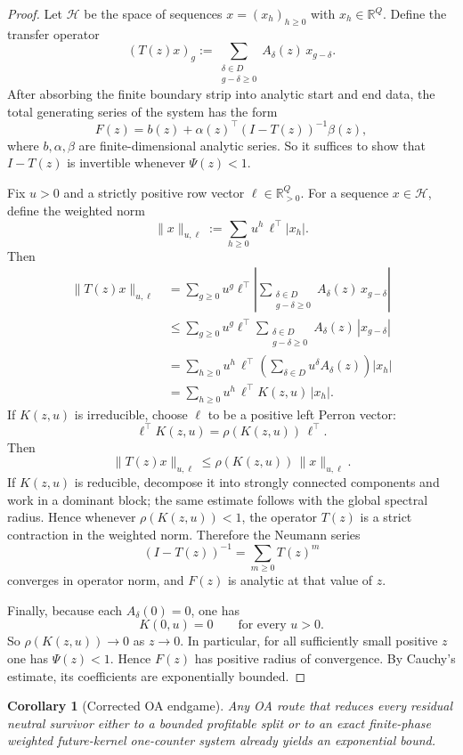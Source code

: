 \documentclass[11pt]{article}
\newtheorem{corollary}[theorem]{Corollary}
\theoremstyle{definition}
\newcommand{\R}{\mathbb{R}}
\newcommand{\1}{\mathbf{1}}
\begin{document}
\begin{proof}
Let $\mathcal H$ be the space of sequences $x=(x_h)_{h\ge 0}$ with $x_h\in \R^Q$.
Define the transfer operator
\[
(T(z)x)_g
:=
\sum_{\substack{\delta\in D\\ g-\delta\ge 0}} A_\delta(z)\,x_{g-\delta}.
\]
After absorbing the finite boundary strip into analytic start and end data, the total generating series of the system has the form
\[
F(z)=b(z)+\alpha(z)^\top (I-T(z))^{-1}\beta(z),
\]
where $b,\alpha,\beta$ are finite-dimensional analytic series.
So it suffices to show that $I-T(z)$ is invertible whenever $\Psi(z)<1$.

Fix $u>0$ and a strictly positive row vector $\ell\in \R_{>0}^Q$.
For a sequence $x\in \mathcal H$, define the weighted norm
\[
\|x\|_{u,\ell}:=\sum_{h\ge 0} u^h\,\ell^\top |x_h|.
\]
Then
\[
\begin{aligned}
\|T(z)x\|_{u,\ell}
&=
\sum_{g\ge 0} u^g \ell^\top
\left|
\sum_{\substack{\delta\in D\\ g-\delta\ge 0}} A_\delta(z)\,x_{g-\delta}
\right|\\
&\le
\sum_{g\ge 0} u^g \ell^\top
\sum_{\substack{\delta\in D\\ g-\delta\ge 0}} A_\delta(z)\,|x_{g-\delta}|\\
&=
\sum_{h\ge 0} u^h\,\ell^\top
\left(\sum_{\delta\in D} u^\delta A_\delta(z)\right)|x_h|\\
&=
\sum_{h\ge 0} u^h\,\ell^\top K(z,u)\,|x_h|.
\end{aligned}
\]
If $K(z,u)$ is irreducible, choose $\ell$ to be a positive left Perron vector:
\[
\ell^\top K(z,u)=\rho(K(z,u))\,\ell^\top.
\]
Then
\[
\|T(z)x\|_{u,\ell}\le \rho(K(z,u))\,\|x\|_{u,\ell}.
\]
If $K(z,u)$ is reducible, decompose it into strongly connected components and work in a dominant block; the same estimate follows with the global spectral radius.
Hence whenever $\rho(K(z,u))<1$, the operator $T(z)$ is a strict contraction in the weighted norm.
Therefore the Neumann series
\[
(I-T(z))^{-1}=\sum_{m\ge 0} T(z)^m
\]
converges in operator norm, and $F(z)$ is analytic at that value of $z$.

Finally, because each $A_\delta(0)=0$, one has
\[
K(0,u)=0
\qquad\text{for every }u>0.
\]
So $\rho(K(z,u))\to 0$ as $z\to 0$.
In particular, for all sufficiently small positive $z$ one has $\Psi(z)<1$.
Hence $F(z)$ has positive radius of convergence.
By Cauchy's estimate, its coefficients are exponentially bounded.
\end{proof}

\begin{corollary}[Corrected OA endgame]\label{cor:future-kernel-one-counter}
Any OA route that reduces every residual neutral survivor either to a bounded profitable split or to an exact finite-phase weighted future-kernel one-counter system already yields an exponential bound.
\end{corollary}
\end{document}
